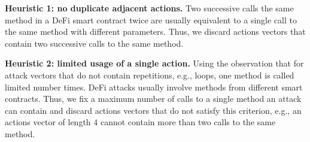 \noindent \textbf{Heuristic 1: no duplicate adjacent actions.} Two successive calls the same method in a DeFi smart contract twice are usually equivalent to a single call to the same method with different parameters. Thus, we discard actions vectors that contain two successive calls to the same method.

\noindent \textbf{Heuristic 2: limited usage of a single action.} Using the observation that for attack vectors that do not contain repetitions, e.g., loops, one method is called limited number times. DeFi attacks usually involve methods from different smart contracts. Thus, we fix a maximum number of calls to a single method an attack can contain and discard actions vectors that do not satisfy this criterion, e.g., an actions vector of length $4$ cannot contain more than two calls to the same method.  











